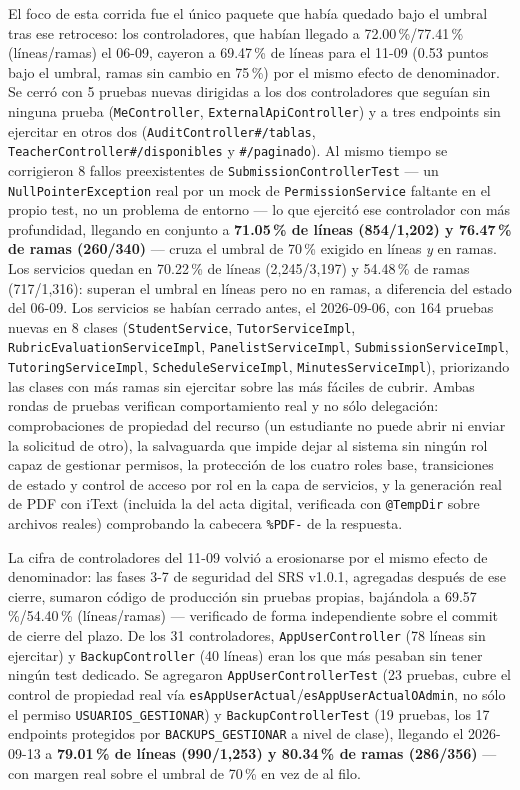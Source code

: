 El foco de esta corrida fue el único paquete que había quedado bajo el umbral tras ese retroceso: los
controladores, que habían llegado a 72.00\,\%/77.41\,\% (líneas/ramas) el 06-09, cayeron a 69.47\,\% de
líneas para el 11-09 (0.53 puntos bajo el umbral, ramas sin cambio en 75\,\%) por el mismo efecto de
denominador. Se cerró con 5 pruebas nuevas dirigidas a los dos controladores que seguían sin ninguna
prueba (\texttt{MeController}, \texttt{ExternalApiController}) y a tres endpoints sin ejercitar en otros
dos (\texttt{AuditController\#/tablas}, \texttt{TeacherController\#/disponibles} y \texttt{\#/paginado}).
Al mismo tiempo se corrigieron 8 fallos preexistentes de \texttt{SubmissionControllerTest} --- un
\texttt{NullPointerException} real por un mock de \texttt{PermissionService} faltante en el propio test, no
un problema de entorno --- lo que ejercitó ese controlador con más profundidad, llegando en conjunto a
\textbf{71.05\,\% de líneas (854/1,202) y 76.47\,\% de ramas (260/340)} --- cruza el umbral de 70\,\%
exigido en líneas \emph{y} en ramas. Los servicios quedan en 70.22\,\% de líneas (2,245/3,197) y
54.48\,\% de ramas (717/1,316): superan el umbral en líneas pero no en ramas, a diferencia del estado del
06-09. Los servicios se habían cerrado antes, el 2026-09-06, con 164 pruebas nuevas en
8 clases (\texttt{StudentService}, \texttt{TutorServiceImpl}, \texttt{RubricEvaluationServiceImpl},
\texttt{PanelistServiceImpl}, \texttt{SubmissionServiceImpl}, \texttt{TutoringServiceImpl},
\texttt{ScheduleServiceImpl}, \texttt{MinutesServiceImpl}), priorizando las clases con más ramas sin
ejercitar sobre las más fáciles de cubrir. Ambas rondas de pruebas verifican comportamiento real y no
sólo delegación: comprobaciones de propiedad del recurso (un estudiante no puede abrir ni enviar la
solicitud de otro), la salvaguarda que impide dejar al sistema sin ningún rol capaz de gestionar permisos,
la protección de los cuatro roles base, transiciones de estado y control de acceso por rol en la capa de
servicios, y la generación real de PDF con iText (incluida la del acta digital, verificada con
\texttt{@TempDir} sobre archivos reales) comprobando la cabecera \texttt{\%PDF-} de la respuesta.

La cifra de controladores del 11-09 volvió a erosionarse por el mismo efecto de denominador: las fases
3-7 de seguridad del SRS v1.0.1, agregadas después de ese cierre, sumaron código de producción sin
pruebas propias, bajándola a 69.57\,\%/54.40\,\% (líneas/ramas) --- verificado de forma independiente
sobre el commit de cierre del plazo. De los 31 controladores, \texttt{AppUserController} (78 líneas sin
ejercitar) y \texttt{BackupController} (40 líneas) eran los que más pesaban sin tener ningún test
dedicado. Se agregaron \texttt{AppUserControllerTest} (23 pruebas, cubre el control de propiedad real vía
\texttt{esAppUserActual}/\texttt{esAppUserActualOAdmin}, no sólo el permiso \texttt{USUARIOS\_GESTIONAR})
y \texttt{BackupControllerTest} (19 pruebas, los 17 endpoints protegidos por \texttt{BACKUPS\_GESTIONAR}
a nivel de clase), llegando el 2026-09-13 a \textbf{79.01\,\% de líneas (990/1,253) y 80.34\,\% de ramas (286/356)} ---
con margen real sobre el umbral de 70\,\% en vez de al filo.

